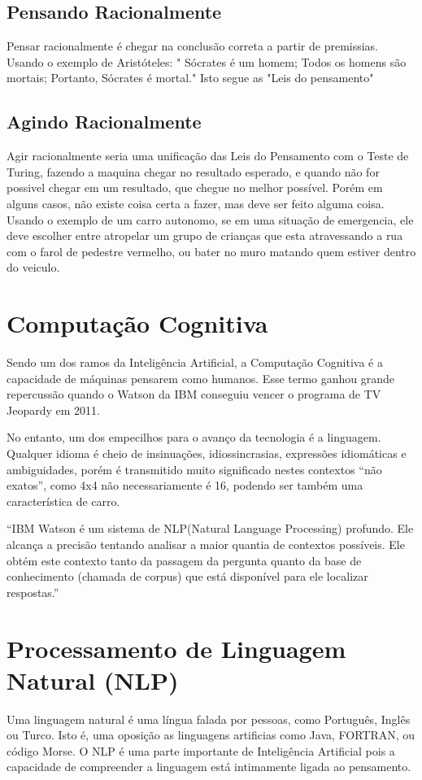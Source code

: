 \documentclass[
	12pt,				%
	openright,			%
	oneside,			%
	a4paper,			%
	english,			%
	spanish,			%
	brazil				%
	]{abntex2}
\begin{document}
	\subsection*{Pensando Racionalmente}
		Pensar racionalmente é chegar na conclusão correta a partir de premissias. Usando o exemplo de Aristóteles: "
Sócrates é um homem; Todos os homens são mortais; Portanto, Sócrates é mortal." Isto segue as "Leis do pensamento" \cite{laws_of_thought}
		
	\subsection*{Agindo Racionalmente}
		Agir racionalmente seria uma unificação das Leis do Pensamento com o Teste de Turing, fazendo a maquina chegar no resultado esperado, e quando não for possivel chegar em um resultado, que chegue no melhor possível. Porém em alguns casos, não existe coisa certa a fazer, mas deve ser feito alguma coisa. Usando o exemplo de um carro autonomo, se em uma situação de emergencia, ele deve escolher entre atropelar um grupo de crianças que esta atravessando a rua com o farol de pedestre vermelho, ou bater no muro matando quem estiver dentro do veiculo.
	
	\section{Computação Cognitiva}

	Sendo um dos ramos da Inteligência Artificial, a Computação Cognitiva é a capacidade de máquinas pensarem como humanos. Esse termo ganhou grande repercussão quando o Watson da IBM conseguiu vencer o programa de TV Jeopardy em 2011.

	No entanto, um dos empecilhos para o avanço da tecnologia é a linguagem. Qualquer idioma é cheio de insinuações, idiossincrasias, expressões idiomáticas e ambiguidades, porém é transmitido muito significado nestes contextos “não exatos”, como 4x4 não necessariamente é 16, podendo ser também uma característica de carro.

	“IBM Watson é um sistema de NLP(Natural Language Processing) profundo. Ele alcança a precisão tentando analisar a maior quantia de contextos possíveis. Ele obtém este contexto tanto da passagem da pergunta quanto da base de conhecimento (chamada de corpus) que está disponível para ele localizar respostas.” \cite{watson_manual} 

	\section{Processamento de Linguagem Natural (NLP)}
	Uma linguagem natural é uma língua falada por pessoas, como Português, Inglês ou Turco. Isto é, uma oposição as linguagens artificias como Java, FORTRAN, ou código Morse. O NLP é uma parte importante de Inteligência Artificial pois a capacidade de compreender a linguagem está intimamente ligada ao pensamento.
	
\end{document}
